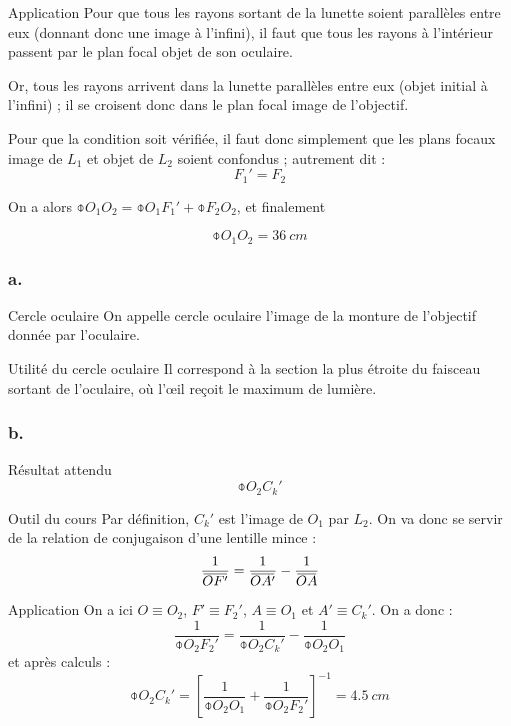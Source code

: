 \documentclass[10pt,a5paper,notitlepage]{book}
\begin{document}
\begin{NCexem}{Application}
    Pour que tous les rayons sortant de la lunette soient parallèles entre eux
    (donnant donc une image à l'infini), il faut que tous les rayons à
    l'intérieur passent par le plan focal objet de son oculaire.\bigbreak

    Or, tous les rayons arrivent dans la lunette parallèles entre eux (objet
    initial à l'infini) ; il se croisent donc dans le plan focal image de
    l'objectif. \bigbreak

    Pour que la condition soit vérifiée, il faut donc simplement que les plans
    focaux image de $L_1$ et objet de $L_2$ soient confondus ; autrement dit :
    \[ \boxed{F_1' = F_2} \]
    
    On a alors $\obar{O_1O_2} = \obar{O_1F_1'} + \obar{F_2O_2}$, et finalement

    \[ \boxed{\obar{O_1O_2} = \SI{+36}{cm}} \]
\end{NCexem}

\subsubsection{a.}
\begin{defi}{Cercle oculaire}
    On appelle cercle oculaire l'image de la monture de l'objectif donnée par
    l'oculaire.
\end{defi}

\begin{inte}{Utilité du cercle oculaire}
    Il correspond à la section la plus étroite du faisceau sortant de
    l'oculaire, où l'œil reçoit le maximum de lumière.  
\end{inte}

\setcounter{subsubsection}{2}
\subsubsection{b.}
\begin{NCprop}{Résultat attendu}
    $$\obar{O_2C_k'}$$
\end{NCprop}

\begin{NCdemo}{Outil du cours}
    Par définition, $C_k'$ est l'image de $O_1$ par $L_2$. On va donc se servir
    de la relation de conjugaison d'une lentille mince :
    \[ \frac{1}{\OF} = \frac{1}{\OAp} - \frac{1}{\OA} \]
\end{NCdemo}

\begin{NCexem}{Application}
    On a ici $O \equiv O_2$, $F' \equiv F_2'$, $A \equiv O_1$ et $A' \equiv
    C_k'$. On a donc :
    \[ \frac{1}{\obar{O_2F_2'}} = \frac{1}{\obar{O_2C_k'}} -
    \frac{1}{\obar{O_2O_1}} \]
    et après calculs :
    \[ \boxed{\obar{O_2C_k'} = \left[ \frac{1}{\obar{O_2O_1}} +
    \frac{1}{\obar{O_2F_2'}}\right]^{-1} = \SI{+4.5}{cm}} \]
\end{NCexem}
\end{document}
